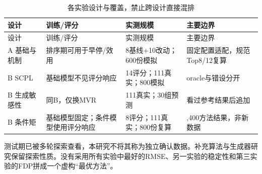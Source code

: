 \documentclass{sufethesismas}
\begin{document}
{
\footnotesize
\begin{longtable}[]{@{}
  >{\raggedright\arraybackslash}p{}
  >{\raggedright\arraybackslash}p{}
  >{\raggedright\arraybackslash}p{}
  >{\raggedright\arraybackslash}p{}@{}}
\caption{各实验设计与覆盖，禁止跨设计直接混排}\tabularnewline
\toprule\noalign{}
\begin{minipage}[b]{\linewidth}\raggedright
设计
\end{minipage} & \begin{minipage}[b]{\linewidth}\raggedright
训练/评分
\end{minipage} & \begin{minipage}[b]{\linewidth}\raggedright
实测规模
\end{minipage} & \begin{minipage}[b]{\linewidth}\raggedright
主要边界
\end{minipage} \\
\midrule\noalign{}
\endfirsthead
\toprule\noalign{}
\begin{minipage}[b]{\linewidth}\raggedright
设计
\end{minipage} & \begin{minipage}[b]{\linewidth}\raggedright
训练/评分
\end{minipage} & \begin{minipage}[b]{\linewidth}\raggedright
实测规模
\end{minipage} & \begin{minipage}[b]{\linewidth}\raggedright
主要边界
\end{minipage} \\
\midrule\noalign{}
\endhead
\bottomrule\noalign{}
\endlastfoot
A 基础与机制 & 排序期可用于早停/效用 & 8基线+10改动；600份模拟 & 固定配置适配，规范Top8/12复算 \\
B SCPL & 基础模型不见评分响应 & 14评分；111真实；800模拟 & oracle与错设分开 \\
B 生成敏感性 & 同B，仅换MVR & 111真实；30组预测 & 看过参考结果后追加 \\
B 条件矩 & 基础模型固定；条件模型使用评分响应 & 8评分；111真实；800份复算 & 6,400方法结果，非新数据 \\
\end{longtable}
}

测试期已被多轮探索查看，本研究不将其称为独立确认数据。补充算法与生成器研究保留探索性质。没有采用所有实验中最好的RMSE、另一实验的稳定性和第三实验的FDP拼成一个虚构``最优方法''。
\end{document}
